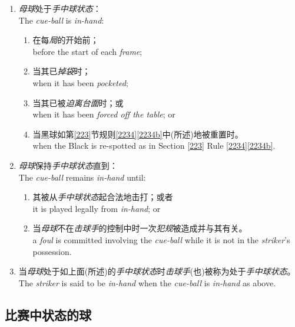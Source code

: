 \begin{enumerate}[label=(\alph*)]
    \item \emph{母球}处于\emph{手中球状态}：\\
    The \emph{cue-ball} is \emph{in-hand}:
    \begin{enumerate}[label=(\roman*)]
        \item 在每\emph{局}的开始前；\\
        before the start of each \emph{frame};
        \item 当其已\emph{掉袋}时；\\
        when it has been \emph{pocketed};
        \item 当其已被\emph{迫离台面}时；或\\
        when it has been \emph{forced off the table}; or
        \item 当黑球如第\ref{223}节规则\ref{2234}\ref{2234b}中(所述)地被重置时。\\
        when the Black is re-spotted as in Section \ref{223} Rule \ref{2234}\ref{2234b}.
    \end{enumerate}
    \item \emph{母球}保持\emph{手中球状态}直到：\\
    The \emph{cue-ball} remains \emph{in-hand} until:
    \begin{enumerate}[label=(\roman*)]
        \item 其被从\emph{手中球状态}起合法地击打；或者\\
        it is played legally from \emph{in-hand}; or
        \item 当\emph{母球}不在\emph{击球手}的控制中时一次\emph{犯规}被造成并与其有关。\\
        a \emph{foul} is committed involving the \emph{cue-ball} while it is not in the \emph{striker}'s possession.
    \end{enumerate}
    \item 当\emph{母球}处于如上面(所述)的\emph{手中球状态}时\emph{击球手}(也)被称为处于\emph{手中球状态}。\\
    The \emph{striker} is said to be \emph{in-hand} when the \emph{cue-ball} is \emph{in-hand} as above.
\end{enumerate}

\subsection{比赛中状态的球}


